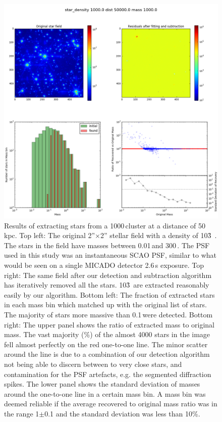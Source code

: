 \begin{appendix}
\begin{figure}
    \centering
    \includegraphics[width=\textwidth]{images/results6_dist=50000_rho=1000}
    \caption{Results of extracting stars from a 1000\,\spa cluster at a distance of 50\,kpc. Top left: The original 2''$\times$2'' stellar field with a density of 10\h3~\spa. The stars in the field have masses between 0.01\,\msun and 300\,\msune. The PSF used in this study was an instantaneous SCAO PSF, similar to what would be seen on a single MICADO detector 2.6\,s exposure. Top right: The same field after our detection and subtraction algorithm has iteratively removed all the stars. 10\h3~\spa are extracted reasonably easily by our algorithm. Bottom left: The fraction of extracted stars in each mass bin which matched up with the original list of stars. The majority of stars more massive than 0.1\,\msun were detected. Bottom right: The upper panel shows the ratio of extracted mass to original mass. The vast majority (\%) of the almost 4000 stars in the image fell almost perfectly on the red one-to-one line. The minor scatter around the line is due to a combination of our detection algorithm not being able to discern between to very close stars, and contamination for the PSF artefacts, e.g. the segmented diffraction spikes. The lower panel shows the standard deviation of masses around the one-to-one line in a certain mass bin. A mass bin was deemed reliable if the average recovered to original mass ratio was in the range 1$\pm$0.1 and the standard deviation was less than 10\%.}
    \label{fig:results_lmc_1E3}
\end{figure}



\end{appendix}
